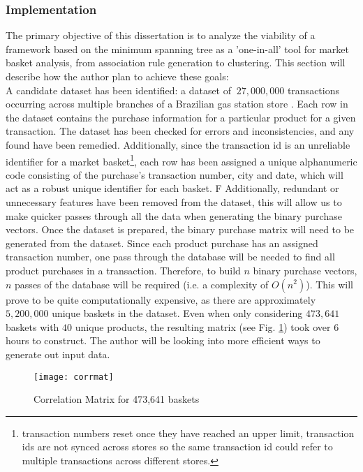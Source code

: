 \documentclass[a4paper,11pt]{article}
\begin{document}
\subsubsection{Implementation}
The primary objective of this dissertation is to analyze the viability of a framework based on the minimum spanning tree as a 'one-in-all' tool for market basket analysis,  from association rule generation to clustering.  This section will describe how the author plan to achieve these goals:\\
A candidate dataset has been identified: a dataset of $~27,000,000$ transactions occurring across multiple branches of a Brazilian gas station store \cite{data_source}. Each row in the dataset contains the purchase information for a particular product for a given transaction. The dataset has been checked for errors and inconsistencies, and any found have been remedied. Additionally, since the transaction id is an unreliable identifier for a market basket\footnote{transaction numbers reset once they have reached an upper limit, transaction ids are not synced across stores so the same transaction id could refer to multiple transactions across different stores.},  each row has been assigned a unique alphanumeric code consisting of the purchase's transaction number, city and date, which will act as a robust unique identifier for each basket. F Additionally, redundant or unnecessary features have been removed from the dataset, this will allow us to make quicker passes through all the data when generating the binary purchase vectors.  Once the dataset is prepared, the binary purchase matrix will need to be generated from the dataset.  Since each product purchase has an assigned transaction number, one pass through the database will be needed to find all product purchases in a transaction. Therefore, to build $n$ binary purchase vectors, $n$ passes of the database will be required (i.e.  a complexity of $O(n^2)$). This will prove to be quite computationally expensive,  as there are approximately $5,200,000$ unique baskets in the dataset.  Even when only considering $473,641$ baskets with $40$ unique products, the resulting matrix (see Fig. \ref{fig:corrmat}) took over 6 hours to construct.  The author will be looking into more efficient ways to generate out input data. \\
\begin{figure}[H]
\centering
\texttt{[image: corrmat]}
\caption{Correlation Matrix for 473,641 baskets}
\label{fig:corrmat}
\end{figure}
\end{document}

